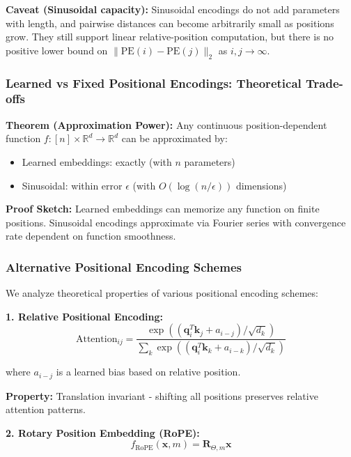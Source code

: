 \textbf{Caveat (Sinusoidal capacity):} Sinusoidal encodings do not add parameters with length, and pairwise distances can become arbitrarily small as positions grow. They still support linear relative-position computation, but there is no positive lower bound on $\|\text{PE}(i)-\text{PE}(j)\|_2$ as $i,j \to \infty$.

\subsubsection{Learned vs Fixed Positional Encodings: Theoretical Trade-offs}

\textbf{Theorem (Approximation Power):} Any continuous position-dependent function $f: [n] \times \mathbb{R}^d \rightarrow \mathbb{R}^d$ can be approximated by:
\begin{itemize}
    \item Learned embeddings: exactly (with $n$ parameters)
    \item Sinusoidal: within error $\epsilon$ (with $O(\log(n/\epsilon))$ dimensions)
\end{itemize}

\textbf{Proof Sketch:} Learned embeddings can memorize any function on finite positions. Sinusoidal encodings approximate via Fourier series with convergence rate dependent on function smoothness.

\subsubsection{Alternative Positional Encoding Schemes}

We analyze theoretical properties of various positional encoding schemes:

\textbf{1. Relative Positional Encoding:}
\begin{equation}
\text{Attention}_{ij} = \frac{\exp((\mathbf{q}_i^T\mathbf{k}_j + a_{i-j})/\sqrt{d_k})}{\sum_k \exp((\mathbf{q}_i^T\mathbf{k}_k + a_{i-k})/\sqrt{d_k})}
\end{equation}

where $a_{i-j}$ is a learned bias based on relative position.

\textbf{Property:} Translation invariant - shifting all positions preserves relative attention patterns.

\textbf{2. Rotary Position Embedding (RoPE):}
\begin{equation}
f_{\text{RoPE}}(\mathbf{x}, m) = \mathbf{R}_{\Theta,m} \mathbf{x}
\end{equation}

